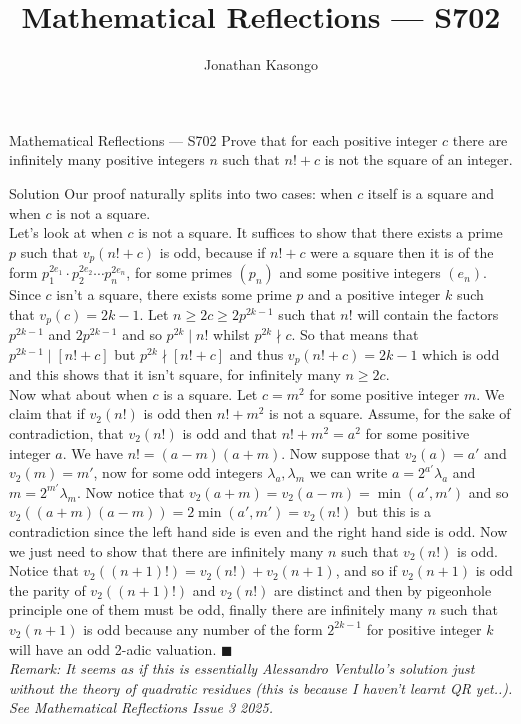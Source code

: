 \documentclass{article}
\author{Jonathan Kasongo}
\title{Mathematical Reflections --- S702}
\begin{document}
\maketitle

\begin{problem}{Mathematical Reflections --- S702}
Prove that for each positive integer $c$ there are infinitely many
positive integers $n$ such that $n! + c$ is not the square of an integer.
\end{problem}

\begin{solution}{Solution}
Our proof naturally splits into two cases: when $c$ itself is a square and
when $c$ is not a square. \\

Let's look at when $c$ is not a square. It suffices to show that there
exists a prime $p$ such that $v_p (n! + c)$ is odd, because if $n! + c$
were a square then it is of the form $p_1^{2e_1} \cdot p_2^{2e_2} \cdots
p_n^{2e_n}$, for some primes $(p_n)$ and some positive integers $(e_n)$.
Since $c$ isn't a square, there exists some prime $p$ and a positive
integer $k$ such that $v_p (c) = 2k-1$. Let $n \geq 2c \geq 2p^{2k-1}$ such
that $n!$ will contain the factors $p^{2k-1}$ and $2p^{2k-1}$ and so
$p^{2k} \mid n!$ whilst $p^{2k} \nmid c$. So that means that
$p^{2k-1} \mid \left[n! + c\right]$ but $p^{2k} \nmid \left[n! + c\right]$
and thus $v_p (n! + c) = 2k-1$ which is odd and this shows that it isn't
square, for infinitely many $n \geq 2c$.\\

Now what about when $c$ is a square. Let $c = m^2$ for some positive integer
$m$. We claim that if $v_2(n!)$ is odd then $n! + m^2$ is not a square.
Assume, for the sake of contradiction, that $v_2(n!)$ is odd and that
$n! + m^2 = a^2$ for some positive integer $a$. We have
$n! = (a-m)(a+m)$. Now suppose that $v_2(a) = a'$ and $v_2(m) = m'$,
now for some odd integers $\lambda_a, \lambda_m$ we can write
$a = 2^{a'} \lambda_a$ and $m = 2^{m'} \lambda_m$. Now notice that
$v_2(a+m) = v_2(a-m) = \min (a', m')$ and so $v_2((a+m)(a-m)) =
2 \min(a', m') = v_2(n!)$ but this is a contradiction since the left hand
side is even and the right hand side is odd. Now we just need to show that
there are infinitely many $n$ such that $v_2(n!)$ is odd. Notice that
$v_2((n+1)!) = v_2(n!) + v_2(n+1)$, and so if $v_2(n+1)$ is odd the parity
of $v_2((n+1)!)$ and $v_2(n!)$ are distinct and then by pigeonhole principle
one of them must be odd, finally there are infinitely many $n$ such that
$v_2(n+1)$ is odd because any number of the form $2^{2k-1}$ for positive
integer $k$ will have an odd 2-adic valuation. $\blacksquare$ \\

\textit{Remark: It seems as if this is essentially Alessandro Ventullo's
solution just without the theory of quadratic residues (this is because I
haven't learnt QR yet..). See Mathematical
Reflections Issue 3 2025.}
\end{solution}
\end{document}
